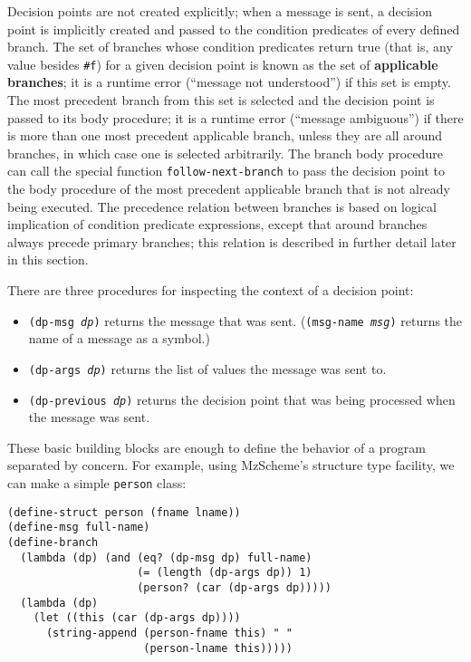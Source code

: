 \documentclass{article}
\newcommand{\defn}[1]{\textbf{#1}}
\newcommand{\code}[1]{\texttt{#1}}
\newcommand{\parm}[1]{\code{\textit{#1}}}
\begin{document}
Decision points are not created explicitly; when a message is
sent, a decision point is implicitly created and passed to the
condition predicates of every defined branch.  The set of branches
whose condition predicates return true (that is, any value besides
\code{\#f}) for a given decision point is known as the set of
\defn{applicable branches}; it is a runtime error (``message not
understood'') if this set is empty.  The most precedent branch from
this set is selected and the decision point is passed to its body
procedure; it is a runtime error (``message ambiguous'') if there is
more than one most precedent applicable branch, unless they are all
around branches, in which case one is selected arbitrarily.  The
branch body procedure can call the special function
\code{follow-next-branch} to pass the decision point to the body
procedure of the most precedent applicable branch that is not already
being executed.  The precedence relation between branches is based on
logical implication of condition predicate expressions, except that
around branches always precede primary branches; this relation is
described in further detail later in this section.

There are three procedures for inspecting the context
of a decision point:

\begin{itemize}
\item \code{(dp-msg \parm{dp})} returns the message that was sent.
      (\code{(msg-name \parm{msg})} returns the name of a message as a
      symbol.)
\item \code{(dp-args \parm{dp})} returns the list of values the
      message was sent to.
\item \code{(dp-previous \parm{dp})} returns the decision
      point that was being processed when the message was sent.
\end{itemize}

These basic building blocks are enough to define the behavior of a
program separated by concern.  For example, using MzScheme's structure
type facility, we can make a simple \code{person} class:

\begin{verbatim}
(define-struct person (fname lname))
(define-msg full-name)
(define-branch
  (lambda (dp) (and (eq? (dp-msg dp) full-name)
                    (= (length (dp-args dp)) 1)
                    (person? (car (dp-args dp)))))
  (lambda (dp)
    (let ((this (car (dp-args dp))))
      (string-append (person-fname this) " "
                     (person-lname this)))))
\end{verbatim}
\end{document}

